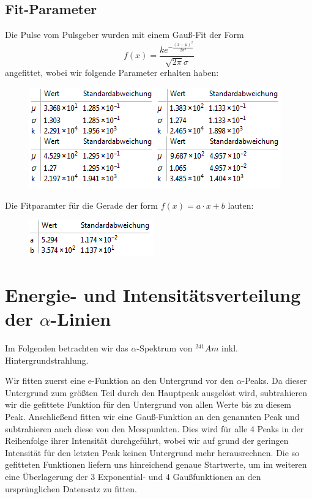 \documentclass[bigchapter,colorback,accentcolor=tud4b,linedtoc,11pt]{tudreport}
\begin{document}
\subsection{Fit-Parameter}
Die Pulse vom Pulsgeber wurden mit einem Gauß-Fit der Form 
$$f(x)=\frac{k e^{-\frac{(x-\mu )^2}{2 \sigma ^2}}}{\sqrt{2 \pi } \sigma }$$
angefittet, wobei wir folgende Parameter erhalten haben:

\begin{figure}[H]
\centering
    \includegraphics[scale=1]{img/kalibr-gauss-fits-parameter.png}
\end{figure}

Die Fitparamter für die Gerade der form $f(x)=a \cdot x + b$ lauten:
\begin{figure}[H]
\centering
    \includegraphics[scale=1]{img/kalibr-gerade-fit-parameter}
\end{figure}




\section{Energie- und Intensitätsverteilung der $\alpha$-Linien}

Im Folgenden betrachten wir das $\alpha$-Spektrum von $^{241}Am$
inkl. Hintergrundstrahlung. 

Wir fitten zuerst eine e-Funktion an den Untergrund vor den $\alpha$-Peaks. Da
dieser Untergrund zum größten Teil durch den Hauptpeak ausgelöst wird,
subtrahieren wir die gefittete Funktion für den Untergrund von allen Werte bis
zu diesem Peak. Anschließend fitten wir eine Gauß-Funktion an den genannten Peak
und subtrahieren auch diese von den Messpunkten. Dies wird für alle 4 Peaks in
der Reihenfolge ihrer Intensität durchgeführt, wobei wir auf grund der geringen
Intensität für den letzten Peak keinen Untergrund mehr herausrechnen. Die so
gefitteten Funktionen liefern uns hinreichend genaue Startwerte, um im weiteren
eine Überlagerung der 3 Exponential- und 4 Gaußfunktionen an den ursprünglichen
Datensatz zu fitten.
\end{document}
